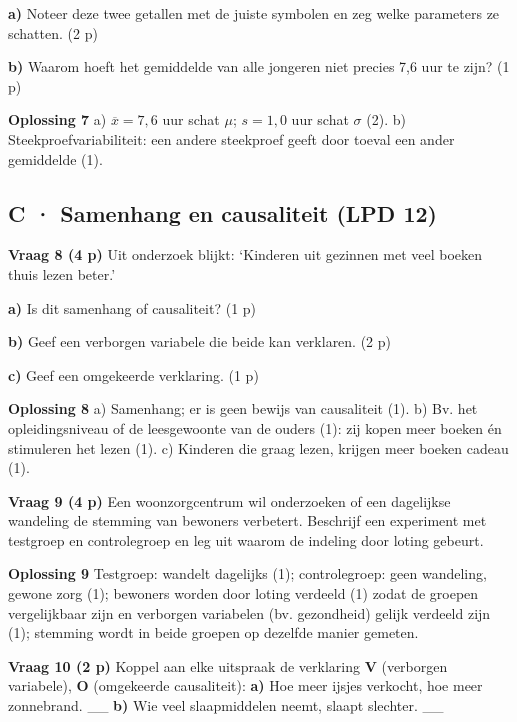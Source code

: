 \textbf{a)} Noteer deze twee getallen met de juiste symbolen en zeg welke parameters ze schatten. (2 p) \lijn

\textbf{b)} Waarom hoeft het gemiddelde van alle jongeren niet precies 7,6 uur te zijn? (1 p) \lijn

\begin{oplossing}
\textbf{Oplossing 7} \quad a) $\overline{x}=7{,}6$ uur schat $\mu$; $s=1{,}0$ uur schat $\sigma$ (2). b) Steekproefvariabiliteit: een andere steekproef geeft door toeval een ander gemiddelde (1).
\end{oplossing}

\subsection*{C · Samenhang en causaliteit (LPD 12)}

\textbf{Vraag 8 \quad (4 p)} Uit onderzoek blijkt: ‘Kinderen uit gezinnen met veel boeken thuis lezen beter.’

\textbf{a)} Is dit samenhang of causaliteit? (1 p) \lijn

\textbf{b)} Geef een verborgen variabele die beide kan verklaren. (2 p) \lijn

\textbf{c)} Geef een omgekeerde verklaring. (1 p) \lijn

\begin{oplossing}
\textbf{Oplossing 8} \quad a) Samenhang; er is geen bewijs van causaliteit (1). b) Bv. het opleidingsniveau of de leesgewoonte van de ouders (1): zij kopen meer boeken én stimuleren het lezen (1). c) Kinderen die graag lezen, krijgen meer boeken cadeau (1).
\end{oplossing}

\textbf{Vraag 9 \quad (4 p)} Een woonzorgcentrum wil onderzoeken of een dagelijkse wandeling de stemming van bewoners verbetert. Beschrijf een experiment met testgroep en controlegroep en leg uit waarom de indeling door loting gebeurt. \lijn

\begin{oplossing}
\textbf{Oplossing 9} \quad Testgroep: wandelt dagelijks (1); controlegroep: geen wandeling, gewone zorg (1); bewoners worden door loting verdeeld (1) zodat de groepen vergelijkbaar zijn en verborgen variabelen (bv. gezondheid) gelijk verdeeld zijn (1); stemming wordt in beide groepen op dezelfde manier gemeten.
\end{oplossing}

\textbf{Vraag 10 \quad (2 p)} Koppel aan elke uitspraak de verklaring \textbf{V} (verborgen variabele), \textbf{O} (omgekeerde causaliteit): \textbf{a)} Hoe meer ijsjes verkocht, hoe meer zonnebrand. \_\_ \quad \textbf{b)} Wie veel slaapmiddelen neemt, slaapt slechter. \_\_


